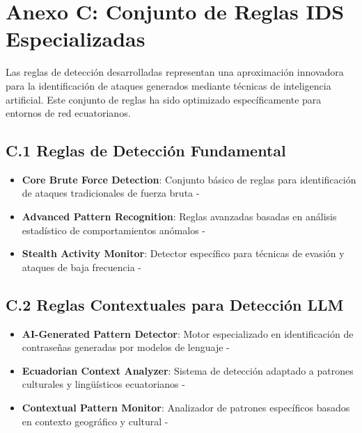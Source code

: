 \section*{Anexo C: Conjunto de Reglas IDS Especializadas}

Las reglas de detección desarrolladas representan una aproximación innovadora para la identificación de ataques generados mediante técnicas de inteligencia artificial. Este conjunto de reglas ha sido optimizado específicamente para entornos de red ecuatorianos.

\subsection*{C.1 Reglas de Detección Fundamental}
\begin{itemize}
    \item \textbf{Core Brute Force Detection}: Conjunto básico de reglas para identificación de ataques tradicionales de fuerza bruta - 
    \item \textbf{Advanced Pattern Recognition}: Reglas avanzadas basadas en análisis estadístico de comportamientos anómalos - 
    \item \textbf{Stealth Activity Monitor}: Detector específico para técnicas de evasión y ataques de baja frecuencia - 
\end{itemize}

\subsection*{C.2 Reglas Contextuales para Detección LLM}
\begin{itemize}
    \item \textbf{AI-Generated Pattern Detector}: Motor especializado en identificación de contraseñas generadas por modelos de lenguaje - 
    \item \textbf{Ecuadorian Context Analyzer}: Sistema de detección adaptado a patrones culturales y lingüísticos ecuatorianos - 
    \item \textbf{Contextual Pattern Monitor}: Analizador de patrones específicos basados en contexto geográfico y cultural - 
\end{itemize}

